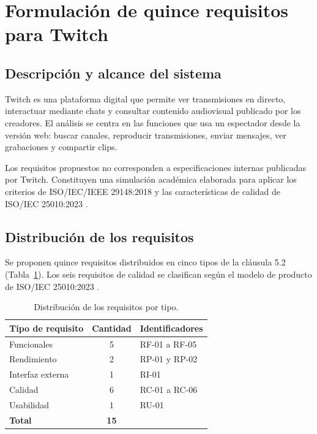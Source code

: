 \documentclass[10pt,a4paper]{article}
\begin{document}
\section{Formulación de quince requisitos para Twitch}

\subsection{Descripción y alcance del sistema}
Twitch es una plataforma digital que permite ver transmisiones en directo, interactuar mediante chats y consultar contenido audiovisual publicado por los creadores. El análisis se centra en las funciones que usa un espectador desde la versión web: buscar canales, reproducir transmisiones, enviar mensajes, ver grabaciones y compartir clips.

Los requisitos propuestos no corresponden a especificaciones internas publicadas por Twitch. Constituyen una simulación académica elaborada para aplicar los criterios de ISO/IEC/IEEE 29148:2018 \cite{iso29148} y las características de calidad de ISO/IEC 25010:2023 \cite{iso25010}.

\subsection{Distribución de los requisitos}
Se proponen quince requisitos distribuidos en cinco tipos de la cláusula 5.2 (Tabla~\ref{tab:distribucion}). Los seis requisitos de calidad se clasifican según el modelo de producto de ISO/IEC 25010:2023 \cite{iso25010}.

\begin{table}[htbp]
\centering
\caption{Distribución de los requisitos por tipo.}\label{tab:distribucion}
\begin{tabular}{@{}lcl@{}}
\toprule
\textbf{Tipo de requisito} & \textbf{Cantidad} & \textbf{Identificadores}\\
\midrule
Funcionales      & 5 & RF-01 a RF-05\\
Rendimiento      & 2 & RP-01 y RP-02\\
Interfaz externa & 1 & RI-01\\
Calidad          & 6 & RC-01 a RC-06\\
Usabilidad       & 1 & RU-01\\
\midrule
\textbf{Total}   & \textbf{15} & \\
\bottomrule
\end{tabular}
\end{table}
\end{document}
